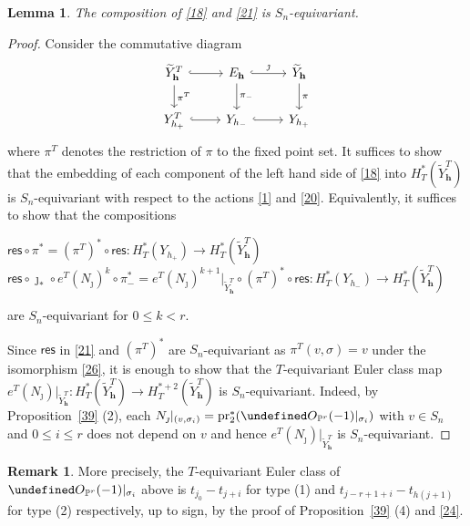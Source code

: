 \documentclass[11pt]{article}
\newtheorem{lemma}[theo]{Lemma}
\theoremstyle{definition}
\newtheorem{remark}[theo]{Remark}
\numberwithin{equation}{section}
\let\cal\undefined
\numberwithin{equation}{section}
\newcommand{\PP}{\mathbb{P}}
\newcommand{\cal}{\mathcal}
\newcommand\cO{{\cal O}}
\newcommand\tY{{\widetilde{Y}}}
\newcommand\lra{\longrightarrow }
\newcommand\pr{\mathrm{pr}}
\newcommand\res{\mathsf{res}}
\newcommand\bh{\mathbf{h}}
\begin{document}
\begin{lemma}\label{n37}
The composition of \eqref{18} and \eqref{21} is $S_n$-equivariant. 
\end{lemma}
\begin{proof}
Consider the commutative diagram 
	\[\begin{tikzcd}\tY_{\bh}^T\ar[r, hook]\ar[d, "\pi^T"] & E_{\bh}\ar[r, hook, "\jmath"] \ar[d, "\pi_-"] & \tY_{\bh} \ar[d, "\pi"] \\ Y_{h_+}^T \ar[r, hook] & Y_{h_-} \ar[r, hook] & Y_{h_+}\end{tikzcd}\]
	where $\pi^T$ denotes the restriction of $\pi$ to the 
	fixed point set.
It suffices to show that the embedding of each component of the left hand side of \eqref{18} into $H^*_T(\tY_\bh^T)$ is $S_n$-equivariant with respect to the actions \eqref{1} and \eqref{20}.  Equivalently, it suffices to show that the compositions
	\begin{center}
		$\res\circ \pi^*=(\pi^T)^*\circ \res :H^*_T(Y_{h_+})\lra H^*_T(\tY_{\bh}^T)$\\
		$\res \circ \jmath_*\circ e^T(N_\jmath)^k\circ\pi_-^*=e^T(N_\jmath)^{k+1}|_{\tY_{\bh}^T}\circ (\pi^T)^*\circ \res :H^*_T(Y_{h_-})\lra H^*_T(\tY_{\bh}^T)$
	\end{center}
	are $S_n$-equivariant for $0\leq k<r$.
	
	Since $\res$ in \eqref{21} and $(\pi^T)^*$ are $S_n$-equivariant as $\pi^T(v,\sigma)=v$ under the isomorphism \eqref{26}, it is enough to show that the $T$-equivariant Euler class map $e^T(N_\jmath)|_{\tY_{\bh}^T}: H^*_T(\tY_{\bh}^T)\to H^{*+2}_T(\tY_{\bh}^T)$ is $S_n$-equivariant. Indeed, by Proposition~\ref{39} (2), each $N_\jmath|_{(v,\sigma_i)}=\pr_2^* (\cO_{\PP^r}(-1)|_{\sigma_i})$ with $v\in S_n$ and $0\leq i\leq r$ does not depend on $v$ and hence $e^T(N_\jmath)|_{\tY_{\bh}^T}$ is $S_n$-equivariant.
\end{proof}	
\begin{remark}
	More precisely, the $T$-equivariant Euler class of $\cO_{\PP^r}(-1)|_{\sigma_i}$ above is $t_{j_0}-t_{j+i}$ for type (1) and $t_{j-r+1+i}-t_{h(j+1)}$ for type (2) respectively, up to sign, by the proof of Proposition~\ref{39} (4) and \eqref{24}.
\end{remark}
\end{document}
